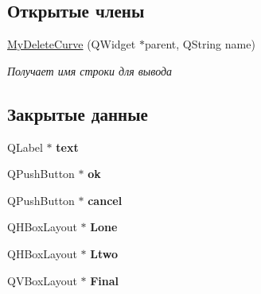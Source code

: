 \subsection*{Открытые члены}
\begin{DoxyCompactItemize}
\item 
\hyperlink{class_my_delete_curve_af14574f71c84bf83931e5a9f3c124361}{My\+Delete\+Curve} (Q\+Widget $\ast$parent, Q\+String name)\hypertarget{class_my_delete_curve_af14574f71c84bf83931e5a9f3c124361}{}\label{class_my_delete_curve_af14574f71c84bf83931e5a9f3c124361}

\begin{DoxyCompactList}\small\item\em Получает имя строки для вывода \end{DoxyCompactList}\end{DoxyCompactItemize}
\subsection*{Закрытые данные}
\begin{DoxyCompactItemize}
\item 
Q\+Label $\ast$ {\bfseries text}\hypertarget{class_my_delete_curve_a6c229d6cb0a65941ea33d6c4553b827b}{}\label{class_my_delete_curve_a6c229d6cb0a65941ea33d6c4553b827b}

\item 
Q\+Push\+Button $\ast$ {\bfseries ok}\hypertarget{class_my_delete_curve_ad68069811a82e7652005a8bef1a4eea5}{}\label{class_my_delete_curve_ad68069811a82e7652005a8bef1a4eea5}

\item 
Q\+Push\+Button $\ast$ {\bfseries cancel}\hypertarget{class_my_delete_curve_a52214e1db933064bb5770ec3e55e982c}{}\label{class_my_delete_curve_a52214e1db933064bb5770ec3e55e982c}

\item 
Q\+H\+Box\+Layout $\ast$ {\bfseries Lone}\hypertarget{class_my_delete_curve_abd945d4ef22afe07394b8cd8711b538c}{}\label{class_my_delete_curve_abd945d4ef22afe07394b8cd8711b538c}

\item 
Q\+H\+Box\+Layout $\ast$ {\bfseries Ltwo}\hypertarget{class_my_delete_curve_a2c5bf4e6debf39d4a9823cac92d0c36a}{}\label{class_my_delete_curve_a2c5bf4e6debf39d4a9823cac92d0c36a}

\item 
Q\+V\+Box\+Layout $\ast$ {\bfseries Final}\hypertarget{class_my_delete_curve_ac6f2498b84a6196601fb2aa8c6465ff1}{}\label{class_my_delete_curve_ac6f2498b84a6196601fb2aa8c6465ff1}

\end{DoxyCompactItemize}


